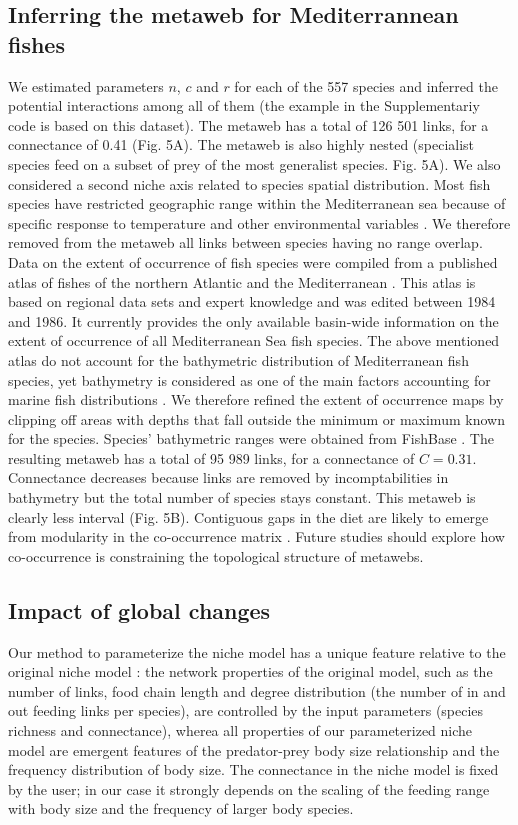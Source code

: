 \documentclass[12pt]{article}
\begin{document}
\subsection{Inferring the metaweb for Mediterrannean fishes}
We estimated parameters $n$, $c$ and $r$ for each of the 557 species and
inferred the potential interactions among all of them (the example in the
Supplementariy code is based on this dataset). The metaweb has a total of 126
501 links, for a connectance of 0.41 (Fig. 5A). The metaweb is also highly
nested (specialist species feed on a subset of prey of the most generalist
species. Fig. 5A). We also considered a second niche axis related to species
spatial distribution. Most fish species have restricted geographic range within
the Mediterranean sea because of specific response to temperature and other
environmental variables \parencite{Albouy2012}. We therefore removed from the
metaweb all links between species having no range overlap. Data on the extent of
occurrence of fish species were compiled from a published atlas of fishes of the
northern Atlantic and the Mediterranean \parencite{Whitehead1986}. This atlas is
based on regional data sets and expert knowledge and was edited between 1984 and
1986. It currently provides the only available basin-wide information on the
extent of occurrence of all Mediterranean Sea fish species. The above mentioned
atlas do not account for the bathymetric distribution of Mediterranean fish
species, yet bathymetry is considered as one of the main factors accounting for
marine fish distributions \parencite{Louisy2005}. We therefore refined the
extent of occurrence maps by clipping off areas with depths that fall outside
the minimum or maximum known for the species. Species' bathymetric ranges were
obtained from FishBase \parencite{Froese2010, Louisy2005}. The resulting metaweb
has a total of 95 989 links, for a connectance of $C = 0.31$. Connectance
decreases because links are removed by incomptabilities in bathymetry but the
total number of species stays constant. This metaweb is clearly less interval
(Fig. 5B). Contiguous gaps in the diet are likely to emerge from modularity in
the co-occurrence matrix \parencite{Araujo2011}. Future studies should explore
how co-occurrence is constraining the topological structure of metawebs.

\subsection{Impact of global changes}
Our method to parameterize the niche model has a unique feature relative to the
original niche model \parencite{Williams2000}: the network properties of the
original model, such as the number of links, food chain length and degree
distribution (the number of in and out feeding links per species), are
controlled by the input parameters (species richness and connectance), wherea
all properties of our parameterized niche model are emergent features of the
predator-prey body size relationship and the frequency distribution of body
size. The connectance in the niche model is fixed by the user; in our case it
strongly depends on the scaling of the feeding range with body size and the
frequency of larger body species.
\end{document}
